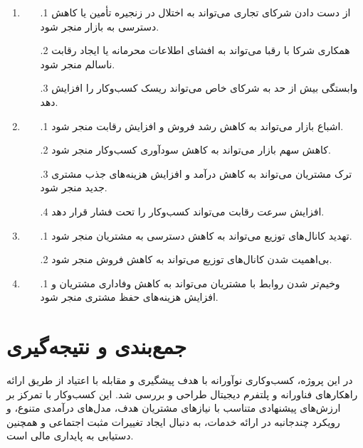 \documentclass[dvipsnames, svgnames, x11names, 11pt]{article}
\begin{document}
\begin{enumerate}
\item {}
\begin{itemize}
\item[\theenumi$.$1]
از دست دادن شرکای تجاری می‌تواند به اختلال در زنجیره تأمین یا کاهش دسترسی به بازار منجر شود.
\item[\theenumi$.$2]
همکاری شرکا با رقبا می‌تواند به افشای اطلاعات محرمانه یا ایجاد رقابت ناسالم منجر شود.
\item[\theenumi$.$3]
وابستگی بیش از حد به شرکای خاص می‌تواند ریسک کسب‌وکار را افزایش دهد.
\end{itemize}

\item {}
\begin{itemize}
\item[\theenumi$.$1]
اشباع بازار می‌تواند به کاهش رشد فروش و افزایش رقابت منجر شود.
\item[\theenumi$.$2]
کاهش سهم بازار می‌تواند به کاهش سودآوری کسب‌وکار منجر شود.
\item[\theenumi$.$3]
ترک مشتریان می‌تواند به کاهش درآمد و افزایش هزینه‌های جذب مشتری جدید منجر شود.
\item[\theenumi$.$4]
افزایش سرعت رقابت می‌تواند کسب‌وکار را تحت فشار قرار دهد.
\end{itemize}

\item {}
\begin{itemize}
\item[\theenumi$.$1]
تهدید کانال‌های توزیع می‌تواند به کاهش دسترسی به مشتریان منجر شود.
\item[\theenumi$.$2]
بی‌اهمیت شدن کانال‌های توزیع می‌تواند به کاهش فروش منجر شود.
\end{itemize}

\item {}
\begin{itemize}
\item[\theenumi$.$1]
وخیم‌تر شدن روابط با مشتریان می‌تواند به کاهش وفاداری مشتریان و افزایش هزینه‌های حفظ مشتری منجر شود.
\end{itemize}
\end{enumerate}

\section{جمع‌بندی و نتیجه‌گیری}
در این پروژه، کسب‌وکاری نوآورانه با هدف پیشگیری و مقابله با اعتیاد از طریق ارائه راهکارهای فناورانه و پلتفرم دیجیتال طراحی و بررسی شد. این کسب‌وکار با تمرکز بر ارزش‌های پیشنهادی متناسب با نیازهای مشتریان هدف، مدل‌های درآمدی متنوع، و رویکرد چندجانبه در ارائه خدمات، به دنبال ایجاد تغییرات مثبت اجتماعی و همچنین دستیابی به پایداری مالی است.
\end{document}
